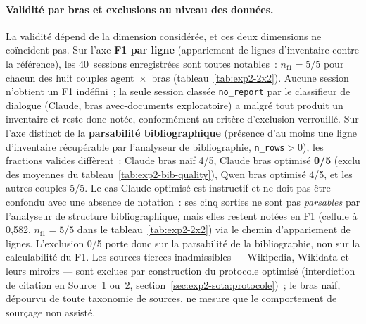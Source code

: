 \documentclass[a4paper,11pt]{report}
\begin{document}
\paragraph{Validité par bras et exclusions au niveau des données.} La validité dépend de la dimension considérée, et ces deux dimensions ne coïncident pas. Sur l'axe \textbf{F1 par ligne} (appariement de lignes d'inventaire contre la référence), les 40~sessions enregistrées sont toutes notables~: $n_{\mathrm{f1}}{=}5/5$ pour chacun des huit couples agent~$\times$~bras (tableau~\ref{tab:exp2-2x2}). Aucune session n'obtient un F1 indéfini~; la seule session classée \texttt{no\_report} par le classifieur de dialogue (Claude, bras avec-documents exploratoire) a malgré tout produit un inventaire et reste donc notée, conformément au critère d'exclusion verrouillé. Sur l'axe distinct de la \textbf{parsabilité bibliographique} (présence d'au moins une ligne d'inventaire récupérable par l'analyseur de bibliographie, \texttt{n\_rows}${>}0$), les fractions valides diffèrent~: Claude bras naïf 4/5, Claude bras optimisé \textbf{0/5} (exclu des moyennes du tableau~\ref{tab:exp2-bib-quality}), Qwen bras optimisé 4/5, et les autres couples 5/5. Le cas Claude optimisé est instructif et ne doit pas être confondu avec une absence de notation~: ses cinq sorties ne sont pas \emph{parsables} par l'analyseur de structure bibliographique, mais elles restent notées en F1 (cellule à 0,582, $n_{\mathrm{f1}}{=}5/5$ dans le tableau~\ref{tab:exp2-2x2}) via le chemin d'appariement de lignes. L'exclusion 0/5 porte donc sur la parsabilité de la bibliographie, non sur la calculabilité du F1. Les sources tierces inadmissibles --- Wikipedia, Wikidata et leurs miroirs --- sont exclues par construction du protocole optimisé (interdiction de citation en Source~1 ou~2, section~\ref{sec:exp2-sota:protocole})~; le bras naïf, dépourvu de toute taxonomie de sources, ne mesure que le comportement de sourçage non assisté.
\end{document}
